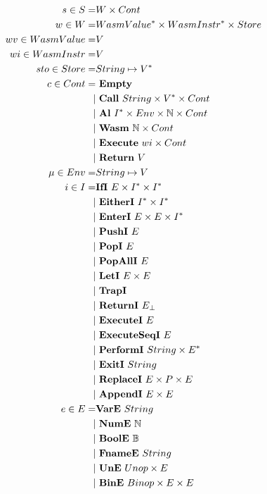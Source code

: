 \begin{align*}
%
  \\
  s \in S =& W \times Cont \\
  w \in W =& \seq{WasmValue} \times \seq{WasmInstr} \times Store \\
  wv \in WasmValue =& V \\
  wi \in WasmInstr =& V \\
  sto \in Store =& String \mapsto \seq V \\
  c \in Cont =& ~ \mt \\
    | & ~ \call ~ String \times \seq V \times Cont \\
    | & ~ \al ~ \seq I \times Env \times \mathbb N \times Cont \\
    | & ~ \wasm ~ \mathbb N \times Cont \\
    | & ~ \exe ~ wi \times Cont \\
    | & ~ \ret ~ V \\
  \mu \in Env =& String \mapsto V \\
  i \in I =& \ifi ~ E \times \seq I \times \seq I \\
    | & ~ \eitheri ~ \seq I \times \seq I \\
    | & ~ \enteri ~ E \times E \times \seq I \\
    | & ~ \pushi ~ E \\
    | & ~ \popi ~ E \\
    | & ~ \popalli ~ E \\
    | & ~ \leti ~ E \times E \\
    | & ~ \trapi \\
    | & ~ \returni ~ E_{\bot} \\
    | & ~ \executei ~ E \\
    | & ~ \executeseqi ~ E \\
    | & ~ \performi ~ String \times \seq{E} \\
    | & ~ \exiti ~ String \\
    | & ~ \replacei ~ E \times P \times E \\
    | & ~ \appendi ~ E \times E \\
%
  e \in E =& \vare ~ String \\
    | & ~ \nume ~ \mathbb N \\
    | & ~ \boole ~ \mathbb B \\
    | & ~ \fnamee ~ String \\
    | & ~ \une ~ Unop \times E \\
    | & ~ \bine ~ Binop \times E \times E \\

\end{align*}
